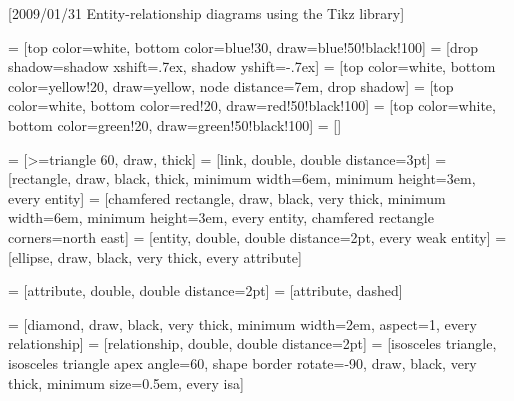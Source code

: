 [2009/01/31 Entity-relationship diagrams using the Tikz library]

\RequirePackage{tikz}
\RequirePackage[normalem]{ulem}  %

\usetikzlibrary{shapes.geometric}
\usetikzlibrary{arrows}
\usetikzlibrary{matrix}
\usetikzlibrary{chains}
\usetikzlibrary{fit}
\usetikzlibrary{positioning}
\usetikzlibrary{decorations.pathreplacing}
\usetikzlibrary{shadows}
\usetikzlibrary{automata}

 = [top color=white, bottom color=blue!30, draw=blue!50!black!100]
 = [drop shadow={shadow xshift=.7ex, shadow yshift=-.7ex}]
 = [top color=white, bottom color=yellow!20, draw=yellow, node distance=7em, drop shadow]
 = [top color=white, bottom color=red!20, draw=red!50!black!100]
 = [top color=white, bottom color=green!20, draw=green!50!black!100]
 = []

 = [>=triangle 60, draw, thick]%
 = [link, double, double distance=3pt]
 = [rectangle, draw, black, thick, minimum width=6em, minimum height=3em, every entity]
 = [chamfered rectangle, draw, black, very thick, minimum width=6em, minimum height=3em, every entity, chamfered rectangle corners=north east]
 = [entity, double, double distance=2pt, every weak entity]
 = [ellipse, draw, black, very thick, every attribute]%

 = [attribute, double, double distance=2pt]
 = [attribute, dashed]

 = [diamond, draw, black, very thick, minimum width=2em, aspect=1, every relationship]
 = [relationship, double, double distance=2pt]
 = [isosceles triangle, isosceles triangle apex angle=60, shape border rotate=-90, draw, black, very thick, minimum size=0.5em, every isa]

\newcommand{\key}[1]{\underline{#1}}

